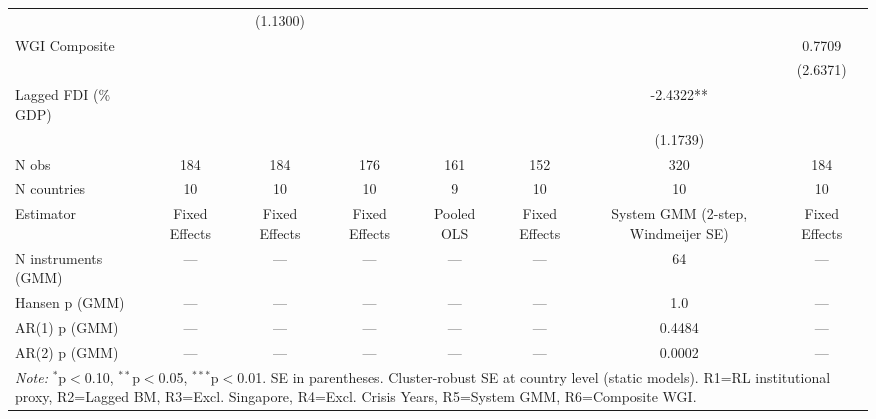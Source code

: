 \begin{table}[htbp]
\begin{tabular}{lccccccc}
 &  & (1.1300) &  &  &  &  &  \\
WGI Composite &  &  &  &  &  &  & 0.7709 \\
 &  &  &  &  &  &  & (2.6371) \\
Lagged FDI (\% GDP) &  &  &  &  &  & -2.4322** &  \\
 &  &  &  &  &  & (1.1739) &  \\
\hline
N obs & 184 & 184 & 176 & 161 & 152 & 320 & 184 \\
N countries & 10 & 10 & 10 & 9 & 10 & 10 & 10 \\
Estimator & Fixed Effects & Fixed Effects & Fixed Effects & Pooled OLS & Fixed Effects & System GMM (2-step, Windmeijer SE) & Fixed Effects \\
N instruments (GMM) & — & — & — & — & — & 64 & — \\
Hansen p (GMM) & — & — & — & — & — & 1.0 & — \\
AR(1) p (GMM) & — & — & — & — & — & 0.4484 & — \\
AR(2) p (GMM) & — & — & — & — & — & 0.0002 & — \\
\hline\hline
\multicolumn{8}{l}{\textit{Note:} $^{*}$p$<$0.10, $^{**}$p$<$0.05, $^{***}$p$<$0.01. SE in parentheses. Cluster-robust SE at country level (static models). R1=RL institutional proxy, R2=Lagged BM, R3=Excl. Singapore, R4=Excl. Crisis Years, R5=System GMM, R6=Composite WGI.}
\end{tabular}
\end{table}